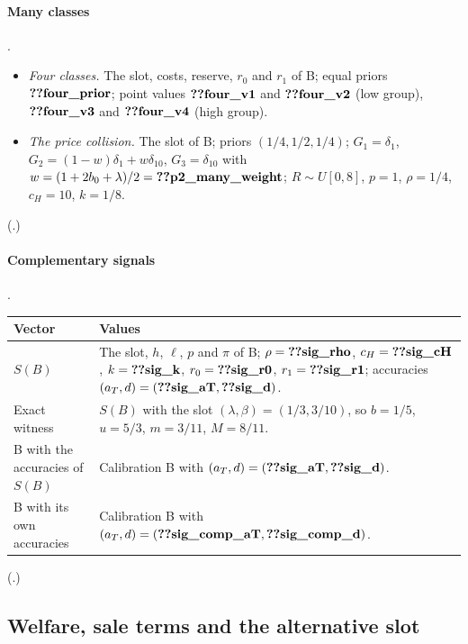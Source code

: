 \paragraph{Many classes} .
\begin{itemize}[nosep]
\item \emph{Four classes.} The slot, costs, reserve, \(r_0\) and \(r_1\) of B; equal priors \(\reg{four_prior}\); point
values \(\reg{four_v1}\) and \(\reg{four_v2}\) (low group), \(\reg{four_v3}\) and \(\reg{four_v4}\) (high group).
\item \emph{The price collision.} The slot of B; priors \((1/4,1/2,1/4)\); \(G_1=\delta_1\),
\(G_2=(1-w)\delta_1+w\delta_{10}\), \(G_3=\delta_{10}\) with \(w=(1+2b_0+\lambda)/2=\reg{p2_many_weight}\);
\(R\sim U[0,8]\), \(p=1\), \(\rho=1/4\), \(c_H=10\), \(k=1/8\).
\end{itemize}
(.)

\paragraph{Complementary signals} .
\begin{center}\small
\begin{tabularx}{\linewidth}{@{}lX@{}}
\toprule
Vector & Values\\
\midrule
\(S(B)\) & The slot, \(h\), \(\ell\), \(p\) and \(\pi\) of B; \(\rho=\reg{sig_rho}\), \(c_H=\reg{sig_cH}\), \(k=\reg{sig_k}\),
\(r_0=\reg{sig_r0}\), \(r_1=\reg{sig_r1}\); accuracies \((a_T,d)=(\reg{sig_aT},\reg{sig_d})\).\\
Exact witness & \(S(B)\) with the slot \((\lambda,\beta)=(1/3,3/10)\), so \(b=1/5\), \(u=5/3\), \(m=3/11\), \(M=8/11\).\\
B with the accuracies of \(S(B)\) & Calibration B with \((a_T,d)=(\reg{sig_aT},\reg{sig_d})\).\\
B with its own accuracies & Calibration B with \((a_T,d)=(\reg{sig_comp_aT},\reg{sig_comp_d})\).\\
\bottomrule
\end{tabularx}
\end{center}
(.)

\subsection{Welfare, sale terms and the alternative slot}\label{sec:B_parameters-sale}

